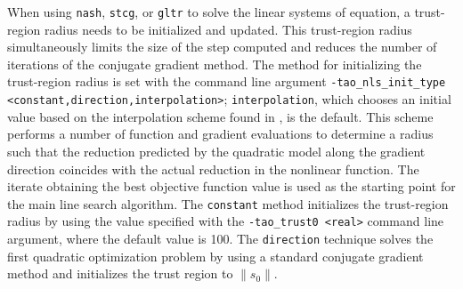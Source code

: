\documentclass[]{book}
\begin{document}
When using {\tt nash}, {\tt stcg}, or {\tt gltr} to solve the linear systems 
of equation,
a trust-region radius needs to be initialized and updated.  This
trust-region
radius simultaneously limits the size of the step computed and reduces the 
number of iterations of the conjugate gradient method.  The method for 
initializing the trust-region radius is set with the command line argument 
{\tt -tao\_nls\_init\_type <constant,direction,interpolation>};
{\tt interpolation}, which chooses an initial value based on the 
interpolation scheme found in \cite{CGT}, is the default.  This
scheme performs a number of function and gradient evaluations to determine 
a radius such that the reduction predicted by the quadratic model along the 
gradient direction coincides with the actual reduction in the nonlinear 
function.  The iterate obtaining the best objective function value is 
used as the starting point for the main line search algorithm.  The 
{\tt constant} method initializes the trust-region radius by using 
the value specified with the {\tt -tao\_trust0 <real>} command line 
argument, where the default value is 100.  The {\tt direction} technique 
solves the first quadratic optimization problem by using a standard 
conjugate gradient method and initializes the trust region to 
$\|s_0\|$.
\end{document}
